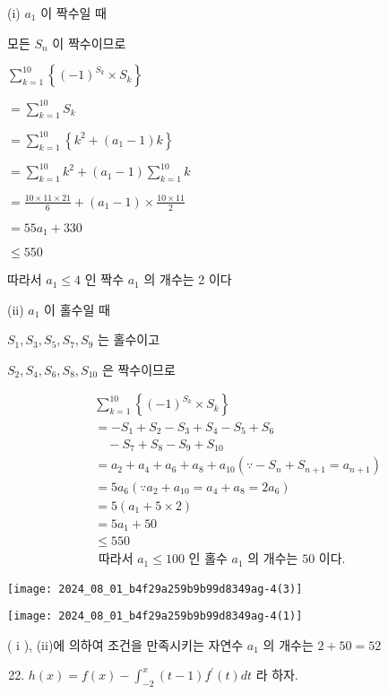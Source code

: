 \documentclass[10pt]{article}
\begin{document}
(i) $a_{1}$ 이 짝수일 때

모든 $S_{n}$ 이 짝수이므로

$\sum_{k=1}^{10}\left\{(-1)^{S_{k}} \times S_{k}\right\}$

$=\sum_{k=1}^{10} S_{k}$

$=\sum_{k=1}^{10}\left\{k^{2}+\left(a_{1}-1\right) k\right\}$

$=\sum_{k=1}^{10} k^{2}+\left(a_{1}-1\right) \sum_{k=1}^{10} k$

$=\frac{10 \times 11 \times 21}{6}+\left(a_{1}-1\right) \times \frac{10 \times 11}{2}$

$=55 a_{1}+330$

$\leq 550$

따라서 $a_{1} \leq 4$ 인 짝수 $a_{1}$ 의 개수는 2 이다

(ii) $a_{1}$ 이 홀수일 때

$S_{1}, S_{3}, S_{5}, S_{7}, S_{9}$ 는 홀수이고

$S_{2}, S_{4}, S_{6}, S_{8}, S_{10}$ 은 짝수이므로

\[
\begin{aligned}
& \sum_{k=1}^{10}\left\{(-1)^{S_{k}} \times S_{k}\right\} \\
& =-S_{1}+S_{2}-S_{3}+S_{4}-S_{5}+S_{6} \\
& \quad-S_{7}+S_{8}-S_{9}+S_{10} \\
& =a_{2}+a_{4}+a_{6}+a_{8}+a_{10}\left(\because-S_{n}+S_{n+1}=a_{n+1}\right) \\
& =5 a_{6}\left(\because a_{2}+a_{10}=a_{4}+a_{8}=2 a_{6}\right) \\
& =5\left(a_{1}+5 \times 2\right) \\
& =5 a_{1}+50 \\
& \leq 550 \\
& \text { 따라서 } a_{1} \leq 100 \text { 인 홀수 } a_{1} \text { 의 개수는 } 50 \text { 이다. }
\end{aligned}
\]

\begin{center}
\texttt{[image: 2024\_08\_01\_b4f29a259b9b99d8349ag-4(3)]}
\end{center}

\begin{center}
\texttt{[image: 2024\_08\_01\_b4f29a259b9b99d8349ag-4(1)]}
\end{center}

( i ), (ii)에 의하여 조건을 만족시키는 자연수 $a_{1}$ 의 개수는 $2+50=52$

\begin{enumerate}
  \setcounter{enumi}{21}
  \item $h(x)=f(x)-\int_{-2}^{x}(t-1) f^{\prime}(t) d t$ 라 하자.
\end{enumerate}
\end{document}
